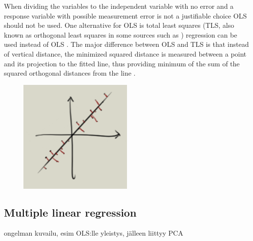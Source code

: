 \documentclass[english, oneside]{HYgradu}
\newcommand{\matr}[1]{\mathbf{#1}}
\begin{document}
\reversemarginpar
{}
When dividing the variables to the independent variable with no error and a response variable with possible measurement error is not a justifiable choice OLS should not be used. One alternative for OLS is total least squares (TLS, also known as orthogonal least squares in some sources such as \citep{feigelson2012modern}) regression can be used instead of OLS \citep{markovsky2007overview}.  The major difference between OLS and TLS is that instead of vertical distance, the minimized squared distance is measured between a point and its projection to the fitted line, thus providing minimum of the sum of the squared orthogonal distances from the line \citep{feigelson2012modern}.

\begin{figure}
   \centering
   \includegraphics[width=0.5\textwidth]{kuvat/TLS-sketch.png}
   \caption{}
   \label{fig:TLS}
\end{figure}


\subsection{Multiple linear regression}
\reversemarginpar
{}
ongelman kuvailu, esim OLS:lle yleistys, jälleen liittyy PCA







\end{document}
